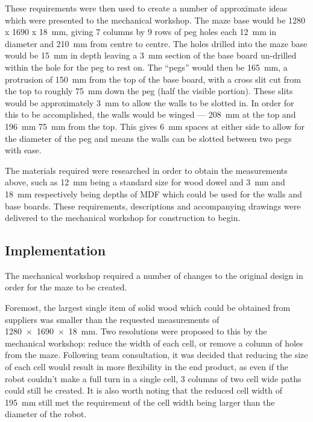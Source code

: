 These requirements were then used to create a number of approximate ideas which 
were presented to the mechanical workshop. The maze base would be \SI{1280 x 
1690 x 18}{\mm}, giving 7 columns by 9 rows of peg holes each \SI{12}{\mm} in 
diameter and \SI{210}{\mm} from centre to centre. The holes drilled into the 
maze base would be \SI{15}{\mm} in depth leaving a \SI{3}{\mm} section of the 
base board un-drilled within the hole for the peg to rest on. The ``pegs'' would 
then be \SI{165}{\mm}, a protrusion of \SI{150}{\mm} from the top of the base 
board, with a cross slit cut from the top to roughly \SI{75}{\mm} down the peg 
(half the visible portion). These slits would be approximately \SI{3}{\mm} to 
allow the walls to be slotted in. In order for this to be accomplished, the 
walls would be winged --- \SI{208}{\mm} at the top and \SI{196}{\mm} \SI{75}
{\mm} from the top. This gives \SI{6}{\mm} spaces at either side to allow for 
the diameter of the peg and means the walls can be slotted between two pegs with 
ease. 

The materials required were researched in order to obtain the measurements 
above, such as \SI{12}{\mm} being a standard size for wood dowel and \SI{3}{\mm} 
and \SI{18}{\mm} respectively being depths of MDF which could be used for the 
walls and base boards. These requirements, descriptions and accompanying 
drawings were delivered to the mechanical workshop for construction to begin. 

\subsection{Implementation}\label{test/maze/impl}
The mechanical workshop required a number of changes to the original design in 
order for the maze to be created.

Foremost, the largest single item of solid wood which could be obtained from 
suppliers was smaller than the requested measurements of \SI{1280 x 1690 x 18}
{\mm}. Two resolutions were proposed to this by the mechanical workshop: reduce 
the width of each cell, or remove a column of holes from the maze. Following 
team consultation, it was decided that reducing the size of each cell would 
result in more flexibility in the end product, as even if the robot couldn't 
make a full turn in a single cell, 3 columns of two cell wide paths could still 
be created. It is also worth noting that the reduced cell width of \SI{195}{\mm} 
still met the requirement of the cell width being larger than the diameter of 
the robot. 

